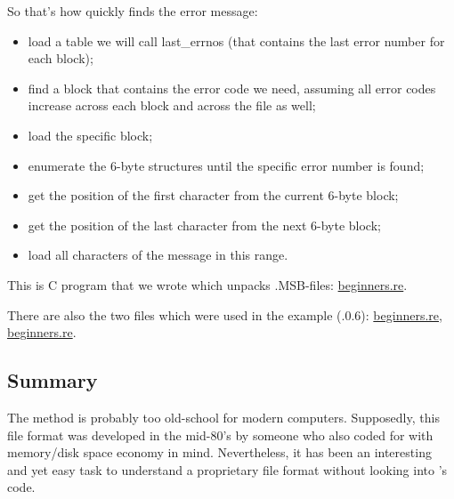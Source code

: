 So that's how \oracle quickly finds the error message:

\begin{itemize}
\item load a table we will call last\_errnos (that contains the last error number for each block);

\item find a block that contains the error code we need, assuming all error codes 
increase across each block and across the file as well;

\item load the specific block;

\item enumerate the 6-byte structures until the specific error number is found;

\item get the position of the first character from the current 6-byte block;

\item get the position of the last character from the next 6-byte block;

\item load all characters of the message in this range.
\end{itemize}

This is C program that we wrote which unpacks .MSB-files:
\href{http://go.yurichev.com/17213}{beginners.re}.

There are also the two files which were used in the example 
(.0.6):
\href{http://go.yurichev.com/17214}{beginners.re},
\href{http://go.yurichev.com/17215}{beginners.re}.

\subsection{Summary}

The method is probably too 
old-school for modern computers.
Supposedly, this file format was developed in the mid-80's by 
someone who also coded for  with
memory/disk space economy in mind.
Nevertheless, it has been an interesting and yet easy task 
to understand a proprietary file format without looking into \oracle's code.
